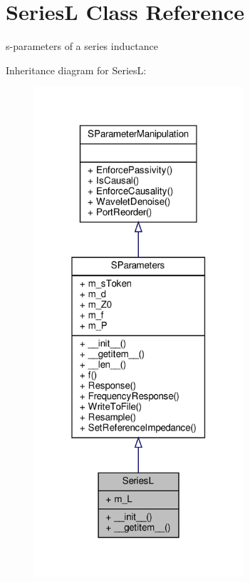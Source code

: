 \hypertarget{classSignalIntegrity_1_1SParameters_1_1Devices_1_1SeriesL_1_1SeriesL}{}\section{SeriesL Class Reference}
\label{classSignalIntegrity_1_1SParameters_1_1Devices_1_1SeriesL_1_1SeriesL}


s-\/parameters of a series inductance  




Inheritance diagram for SeriesL\+:
\nopagebreak
\begin{figure}[H]
\begin{center}
\leavevmode
\includegraphics[width=220pt]{classSignalIntegrity_1_1SParameters_1_1Devices_1_1SeriesL_1_1SeriesL__inherit__graph}
\end{center}
\end{figure}


